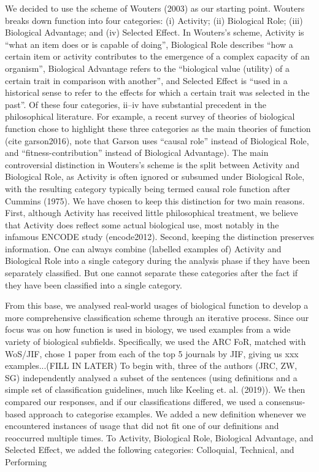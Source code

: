 \documentclass{article}
\begin{document}
We decided to use the scheme of Wouters (2003) as our starting point.
Wouters breaks down function into four categories: (i) Activity; (ii) Biological Role; (iii) Biological Advantage; and (iv) Selected Effect.
In Wouters's scheme, Activity is ``what an item does or is capable of doing'', Biological Role describes ``how a certain item or activity contributes to the emergence of a complex capacity of an organism'', Biological Advantage refers to the ``biological value (utility) of a certain trait in comparison with another'', and Selected Effect is ``used in a historical sense to refer to the effects for which a certain trait was selected in the past''.
Of these four categories, ii--iv have substantial precedent in the philosophical literature.
For example, a recent survey of theories of biological function chose to highlight these three categories as the main theories of function (cite garson2016), note that Garson uses ``causal role'' instead of Biological Role, and ``fitness-contribution'' instead of Biological Advantage).
The main controversial distinction in Wouters's scheme is the split between Activity and Biological Role, as Activity is often ignored or subsumed under Biological Role, with the resulting category typically being termed causal role function after Cummins (1975).
We have chosen to keep this distinction for two main reasons.
First, although Activity has received little philosophical treatment, we believe that Activity does reflect some actual biological use, most notably in the infamous ENCODE study (encode2012).
Second, keeping the distinction preserves information.
One can always combine (labelled examples of) Activity and Biological Role into a single category during the analysis phase if they have been separately classified.
But one cannot separate these categories after the fact if they have been classified into a single category.

From this base, we analysed real-world usages of biological function to develop a more comprehensive classification scheme through an iterative process.
Since our focus was on how function is used in biology, we used examples from a wide variety of biological subfields.
Specifically, we used the ARC FoR, matched with WoS/JIF, chose 1 paper from each of the top 5 journals by JIF, giving us xxx examples...(FILL IN LATER)
To begin with, three of the authors (JRC, ZW, SG) independently analysed a subset of the sentences (using definitions and a simple set of classification guidelines, much like Keeling et. al. (2019)).
We then compared our responses, and if our classifications differed, we used a consensus-based approach to categorise examples.
We added a new definition whenever we encountered instances of usage that did not fit one of our definitions and reoccurred multiple times.
To Activity, Biological Role, Biological Advantage, and Selected Effect, we added the following categories: Colloquial, Technical, and Performing
\end{document}
